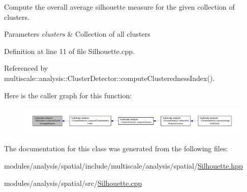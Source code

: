 Compute the overall average silhouette measure for the given collection of clusters. 


\begin{DoxyParams}{Parameters}
{\em clusters} & Collection of all clusters \\
\hline
\end{DoxyParams}


Definition at line 11 of file Silhouette.\-cpp.



Referenced by multiscale\-::analysis\-::\-Cluster\-Detector\-::compute\-Clusteredness\-Index().



Here is the caller graph for this function\-:\nopagebreak
\begin{figure}[H]
\begin{center}
\leavevmode
\includegraphics[width=350pt]{classmultiscale_1_1analysis_1_1Silhouette_a21fab3292947caed2dbab0da542ac24c_icgraph}
\end{center}
\end{figure}




The documentation for this class was generated from the following files\-:\begin{DoxyCompactItemize}
\item 
modules/analysis/spatial/include/multiscale/analysis/spatial/\hyperlink{Silhouette_8hpp}{Silhouette.\-hpp}\item 
modules/analysis/spatial/src/\hyperlink{Silhouette_8cpp}{Silhouette.\-cpp}\end{DoxyCompactItemize}
